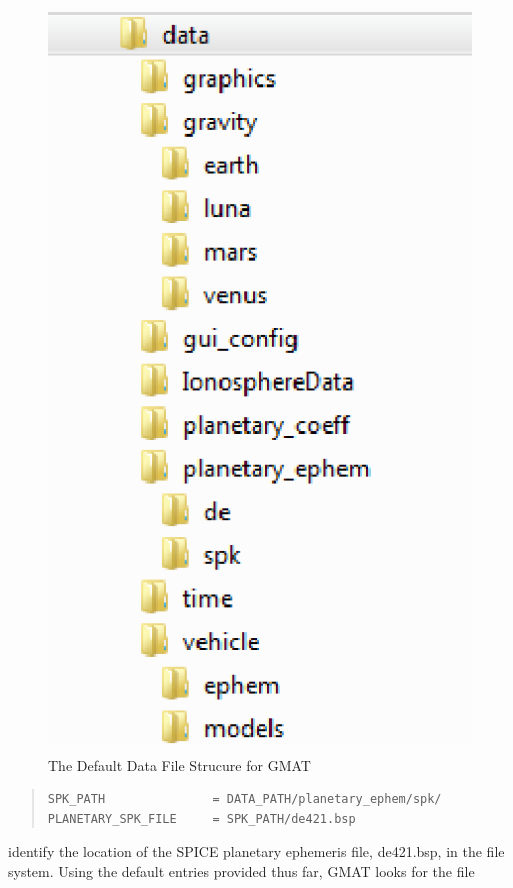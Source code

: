\documentclass[letterpaper,10pt]{article}%
\begin{document}
\begin{figure}[htb]
  \begin{center}
	\includegraphics{DataFileLayout.eps}
	\caption{The Default Data File Strucure for GMAT}
	\label{fig:DataFileStrucure}
  \end{center}
\end{figure}


\begin{quote}
\begin{verbatim}
SPK_PATH               = DATA_PATH/planetary_ephem/spk/
PLANETARY_SPK_FILE     = SPK_PATH/de421.bsp
\end{verbatim}
\end{quote}

\noindent identify the location of the SPICE planetary ephemeris file, de421.bsp, in the file system.  Using the default entries provided thus far, GMAT looks for the file
\end{document}
